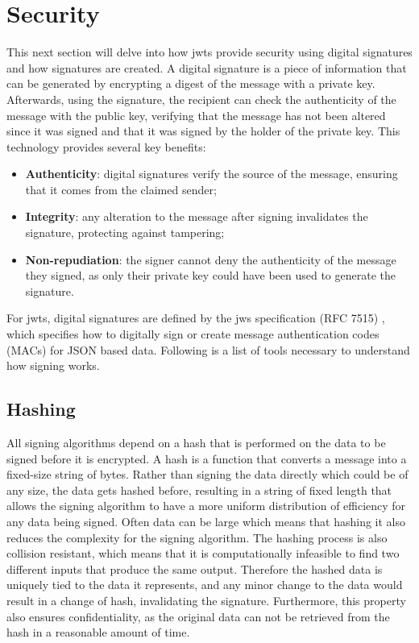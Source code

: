\section{Security}
This next section will delve into how \gls{jwt}s provide security using digital signatures and how signatures are created.
A digital signature is a piece of information that can be generated by encrypting a digest of the message with a private key. Afterwards, using the signature, the recipient can check the authenticity of the message with the public key, verifying that the message has not been altered since it was signed and that it was signed by the holder of the private key.
This technology provides several key benefits:
\begin{itemize}
    \item \textbf{Authenticity}: digital signatures verify the source of the message, ensuring that it comes from the claimed sender;
    \item \textbf{Integrity}: any alteration to the message after signing invalidates the signature, protecting against tampering;
    \item \textbf{Non-repudiation}: the signer cannot deny the authenticity of the message they signed, as only their private key could have been used to generate the signature.
\end{itemize}
For \gls{jwt}s, digital signatures are defined by the \gls{jws} specification (RFC 7515) \cite{rfc7515-jws}, which specifies how to digitally sign or create message authentication codes (MACs) for JSON based data.
Following is a list of tools necessary to understand how signing works.

\subsection{Hashing}
All signing algorithms depend on a hash that is performed on the data to be signed before it is encrypted. A hash is a function that converts a message into a fixed-size string of bytes. Rather than signing the data directly which could be of any size, the data gets hashed before, resulting in a string of fixed length that allows the signing algorithm to have a more uniform distribution of efficiency for any data being signed. Often data can be large which means that hashing it also reduces the complexity for the signing algorithm. The hashing process is also collision resistant, which means that it is computationally infeasible to find two different inputs that produce the same output. Therefore the hashed data is uniquely tied to the data it represents, and any minor change to the data would result in a change of hash, invalidating the signature. Furthermore, this property also ensures confidentiality, as the original data can not be retrieved from the hash in a reasonable amount of time. \cite{digsig-dummies}


